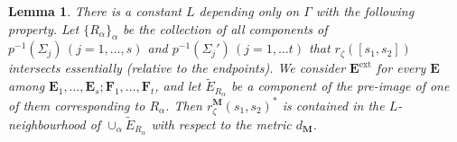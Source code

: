 \documentclass{amsart}
\newtheorem{lemma}[theorem]{Lemma}
\theoremstyle{definition}
\begin{document}
\begin{lemma}
\label{passing corresponding one}
There is a constant $L$ depending only on $\Gamma$ with the following property.
Let $\{R_\alpha\}_\alpha$ be the collection of all components of  $p^{-1}(\Sigma_j)\, (j=1, \dots , s)$ and  $p^{-1}(\Sigma_j')\, (j=1, \dots t)$  that  $r_\zeta([s_1,s_2])$ intersects essentially (relative to the endpoints).
We consider $\mathbf E^{\mathrm{ext}}$ for every $\mathbf E$ among $\mathbf E_1, \dots , \mathbf E_s; \mathbf F_1, \dots, \mathbf F_t$, and let $\widetilde{E}_{R_\alpha}$ be a component of the pre-image of one of them  corresponding to  $R_\alpha$.
Then $r_\zeta^{\mathbf M}(s_1, s_2)^*$ is contained in the $L$-neighbourhood of $\cup_\alpha \widetilde{E}_{R_\alpha}$ with respect to the metric $d_\mathbf{M}$.
\end{lemma}
\end{document}

